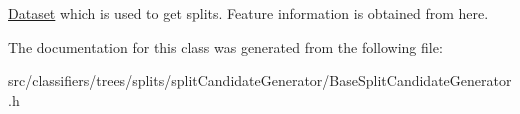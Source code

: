 \hyperlink{classffactory_1_1_dataset}{Dataset} which is used to get splits. Feature information is obtained from here. 

The documentation for this class was generated from the following file\-:\begin{DoxyCompactItemize}
\item 
src/classifiers/trees/splits/split\-Candidate\-Generator/Base\-Split\-Candidate\-Generator.\-h\end{DoxyCompactItemize}
